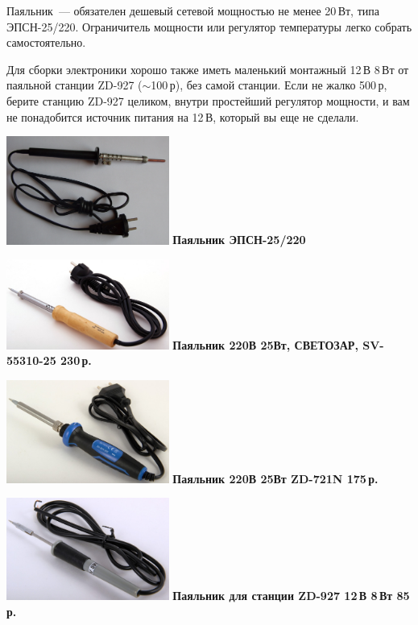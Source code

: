 
\secdown


Паяльник\ --- обязателен дешевый сетевой мощностью не менее 20\,Вт, типа
ЭПСН-25/220. Ограничитель мощности или регулятор температуры легко собрать
самостоятельно.

Для сборки электроники хорошо также иметь маленький монтажный 12\,В 8\,Вт от
паяльной станции ZD-927 ($\sim$100\,р), без самой станции. Если не жалко 500\,р,
берите станцию ZD-927 целиком, внутри простейший регулятор мощности, и вам не
понадобится источник питания на 12\,В, который вы еще не сделали.

\noindent\includegraphics[width=0.4\textwidth]{tech/tools/solder/EPSN25.jpg}
\textbf{Паяльник ЭПСН-25/220}

\noindent\includegraphics[width=0.4\textwidth]{tech/tools/solder/SV-55310-25.jpg}
\textbf{Паяльник 220В 25Вт, СВЕТОЗАР, SV-55310-25 230\,р.}

\noindent\includegraphics[width=0.4\textwidth]{tech/tools/solder/ZD-721N.jpg}
\textbf{Паяльник 220В 25Вт ZD-721N 175\,р.}

\noindent\includegraphics[width=0.4\textwidth]{tech/tools/solder/Iron8W.jpg}
\textbf{Паяльник для станции ZD-927 12\,В 8\,Вт 85\,р.}

